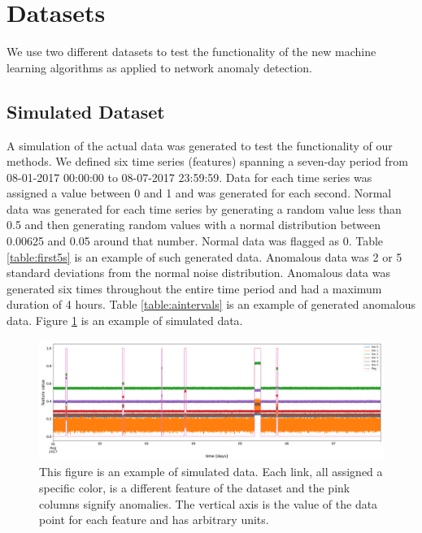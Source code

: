 \documentclass[5p]{elsarticle}
\begin{document}
\section{Datasets}

We use two different datasets to test the functionality of the new machine learning algorithms as applied to network anomaly detection. 

\subsection{Simulated Dataset}

A simulation of the actual data was generated to test the functionality of our methods. We defined six time series (features) spanning a seven-day period from 08-01-2017 00:00:00 to 08-07-2017 23:59:59. Data for each time series was assigned a value between 0 and 1 and was generated for each second. Normal data was generated for each time series by generating a random value less than 0.5 and then generating random values with a normal distribution between 0.00625 and 0.05 around that number. Normal data was flagged as 0. Table \ref{table:first5s} is an example of such generated data. Anomalous data was 2 or 5 standard deviations from the normal noise distribution. Anomalous data was generated six times throughout the entire time period and had a maximum duration of 4 hours. Table \ref{table:aintervals} is an example of generated anomalous data. Figure \ref{fig:untouched} is an example of simulated data. 

\begin{figure}[htbp]
    \centering
    \includegraphics[width=1.0\textwidth]{untouched.png}
    \caption{This figure is an example of simulated data. Each link, all assigned a specific color, is a different feature of the dataset and the pink columns signify anomalies. The vertical axis is the value of the data point for each feature and has arbitrary units.}
    \label{fig:untouched}
\end{figure}
\end{document}
